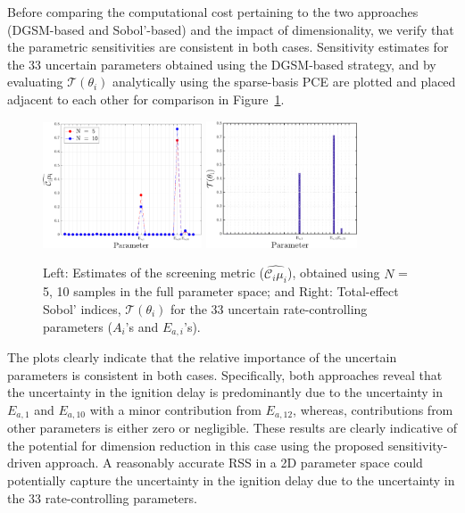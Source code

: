 {Before comparing the computational cost pertaining to the two approaches (DGSM-based and 
Sobol'-based) and the impact of dimensionality, we verify that the parametric sensitivities are
consistent in both cases. Sensitivity estimates for the 33 uncertain parameters obtained
using the DGSM-based strategy, and by evaluating $\mathcal{T}(\theta_i)$ analytically
using the sparse-basis PCE are plotted and placed adjacent to each other for comparison
in Figure~\ref{fig:sense33D}.
%
\begin{figure}[htbp]
 \begin{center}
  \includegraphics[width=0.42\textwidth]{./Figures/ub33D}
  \includegraphics[width=0.40\textwidth]{./Figures/sens_kinetics33D}
\caption{
Left: Estimates of the screening metric ($\widehat{\mathcal{C}_i\mu_i}$), 
obtained using $N$ = 5, 10 samples in the full parameter space; and
Right: Total-effect Sobol' indices, $\mathcal{T}(\theta_i)$ for the 33 uncertain rate-controlling
parameters ($A_i$'s and $E_{a,i}$'s).}
\label{fig:sense33D}
\end{center}
\end{figure}
%
The plots clearly indicate that the relative importance of the uncertain parameters is
consistent in both cases. Specifically, both approaches reveal that the uncertainty in
the ignition delay is predominantly due to the uncertainty in $E_{a,1}$ and $E_{a,10}$ with a 
minor contribution from $E_{a,12}$, whereas, contributions from other parameters is either zero
or negligible. These results are clearly indicative of the potential for dimension reduction in this
case using the proposed sensitivity-driven approach. A reasonably accurate RSS in a 2D
parameter space could potentially capture the uncertainty in the ignition delay due to the
uncertainty in the 33 rate-controlling parameters.

}
